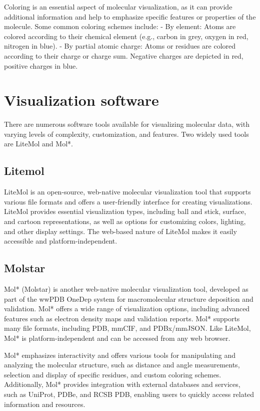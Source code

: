 \documentclass[
  digital,     %
  oneside,     %
  nosansbold,  %
  nocolorbold, %
  lof,         %
  lot,         %
]{fithesis4}
\begin{document}
Coloring is an essential aspect of molecular visualization, as it can provide additional information and help to emphasize specific features or properties of the molecule. Some common coloring schemes include:
- By element: Atoms are colored according to their chemical element (e.g., carbon in grey, oxygen in red, nitrogen in blue).
- By partial atomic charge: Atoms or residues are colored according to their charge or charge sum. Negative charges are depicted in red, positive charges in blue.

\section{Visualization software}
\label{section:visualization_software}

There are numerous software tools available for visualizing molecular data, with varying levels of complexity, customization, and features. Two widely used tools are LiteMol and Mol*.

\subsection{Litemol}
\label{subsection:litemol}

LiteMol is an open-source, web-native molecular visualization tool that supports various file formats and offers a user-friendly interface for creating visualizations. LiteMol provides essential visualization types, including ball and stick, surface, and cartoon representations, as well as options for customizing colors, lighting, and other display settings. The web-based nature of LiteMol makes it easily accessible and platform-independent.

\subsection{Molstar}
\label{subsection:molstar}

Mol* (Molstar) is another web-native molecular visualization tool, developed as part of the wwPDB OneDep system for macromolecular structure deposition and validation. Mol* offers a wide range of visualization options, including advanced features such as electron density maps and validation reports. Mol* supports many file formats, including PDB, mmCIF, and PDBx/mmJSON. Like LiteMol, Mol* is platform-independent and can be accessed from any web browser.

Mol* emphasizes interactivity and offers various tools for manipulating and analyzing the molecular structure, such as distance and angle measurements, selection and display of specific residues, and custom coloring schemes. Additionally, Mol* provides integration with external databases and services, such as UniProt, PDBe, and RCSB PDB, enabling users to quickly access related information and resources.
\end{document}
